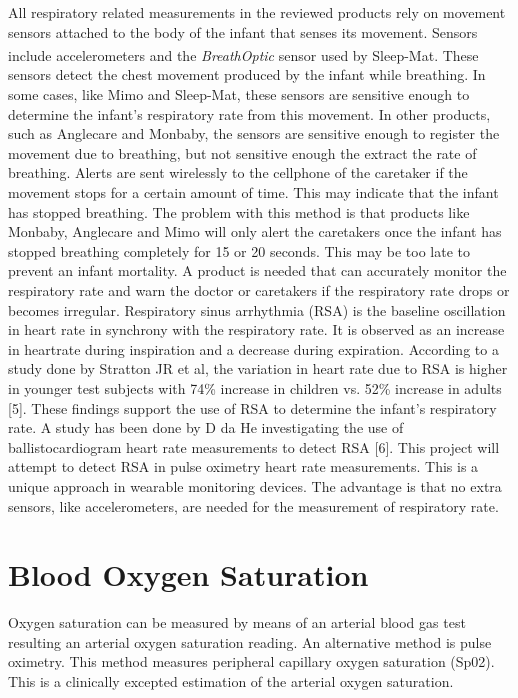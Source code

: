 All respiratory related measurements in the reviewed products rely on movement sensors attached to the body of the infant that senses its movement. Sensors include accelerometers and the \textit{BreathOptic}\textsuperscript{\texttrademark} sensor used by Sleep-Mat. These sensors detect the chest movement produced by the infant while breathing. In some cases, like Mimo and Sleep-Mat, these sensors are sensitive enough to determine the infant's respiratory rate from this movement. In other products, such as Anglecare and Monbaby, the sensors are sensitive enough to register the movement due to breathing, but not sensitive enough the extract the rate of breathing.
Alerts are sent wirelessly to the cellphone of the caretaker if the movement stops for a certain amount of time. This may indicate that the infant has stopped breathing. The problem with this method is that products like Monbaby, Anglecare and Mimo will only alert the caretakers once the infant has stopped breathing completely for 15 or 20 seconds. This may be too late to prevent an infant mortality. A product is needed that can accurately monitor the respiratory rate and warn the doctor or caretakers if the respiratory rate drops or becomes irregular.
Respiratory sinus arrhythmia (RSA) is the baseline oscillation in heart rate in synchrony with the respiratory rate. It is observed as an increase in heartrate during inspiration and a decrease during expiration. According to a study done by Stratton JR et al, the variation in heart rate due to RSA is higher in younger test subjects with 74\% increase in children vs. 52\% increase in adults [5]. These findings support the use of RSA to determine the infant's respiratory rate. A study has been done by D da He investigating the use of ballistocardiogram heart rate measurements to detect RSA [6]. This project will attempt to detect RSA in pulse oximetry heart rate measurements. This is a unique approach in wearable monitoring devices. The advantage is that no extra sensors, like accelerometers, are needed for the measurement of respiratory rate.

\section{Blood Oxygen Saturation}
Oxygen saturation can be measured by means of an arterial blood gas test resulting an arterial oxygen saturation reading. An alternative method is pulse oximetry. This method measures peripheral capillary oxygen saturation (Sp02). This is a clinically excepted estimation of the arterial oxygen saturation.

